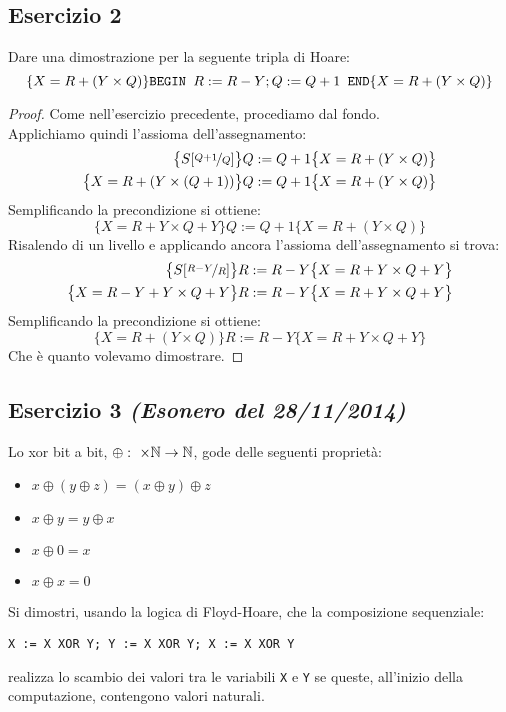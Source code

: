 \subsection{Esercizio 2}
Dare una dimostrazione per la seguente tripla di Hoare:
\[ 
  \{X=R+(Y \times Q) \} \text{\texttt{BEGIN }} R:=R-Y; Q:=Q+1
  \text{\texttt{ END}} \{X=R+(Y \times Q)\} 
\]

\begin{proof}
Come nell'esercizio precedente, procediamo dal fondo.\\
Applichiamo quindi l'assioma dell'assegnamento:
\begin{align*}
  \bigl\{S[\nicefrac{Q+1}{Q}] \bigr\} & Q:=Q+1 \bigl\{X=R+(Y \times Q)\bigr\}\\
  \bigl\{X=R+(Y \times (Q+1)) \bigr\} & Q:=Q+1 \bigl\{X=R+(Y \times Q)\bigr\}
\end{align*}
Semplificando la precondizione si ottiene:
\[ \bigl\{X=R+Y \times Q + Y \bigr\} Q:=Q+1 \bigl\{X=R+(Y \times Q)\bigr\} \]
Risalendo di un livello e applicando ancora l'assioma dell'assegnamento si trova:
\begin{align*}
\bigl\{S[\nicefrac{R-Y}{R}] \bigr\} & R:=R-Y \bigl\{X=R+Y \times Q + Y \bigr\}\\
\bigl\{X= R-Y+Y \times Q+Y \bigr\} & R:=R-Y \bigl\{X=R+Y \times Q + Y \bigr\}
\end{align*}
Semplificando la precondizione si ottiene:
\[ \bigl\{X= R+(Y \times Q) \bigr\} R:=R-Y \bigl\{X=R+Y \times Q + Y \bigr\} \]
Che è quanto volevamo dimostrare.
\end{proof}

\subsection{Esercizio 3 \emph{(Esonero del 28/11/2014)}}
Lo xor bit a bit, $ \oplus: \ \times \mathbb{N} \rightarrow \mathbb{N} $, gode delle
seguenti proprietà:
\begin{itemize}
        \item $ x \oplus (y \oplus z) = (x \oplus y) \oplus z $ 
        \item $ x \oplus y = y \oplus x $ 
        \item $ x \oplus 0 = x $ 
        \item $ x \oplus x = 0 $ 
\end{itemize}
Si dimostri, usando la logica di Floyd-Hoare, che la composizione sequenziale:
\begin{center}
\texttt{X := X XOR Y; Y := X XOR Y; X := X XOR Y}
\end{center}
realizza lo scambio dei valori tra le variabili \texttt{X} e \texttt{Y} se queste, all'inizio della computazione, contengono valori naturali.

